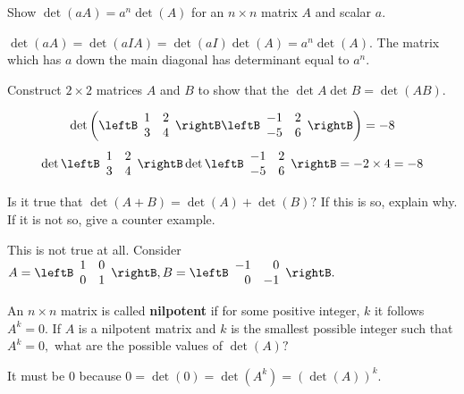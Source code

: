 \begin{enumialphparenastyle}
\begin{ex} Show $\det \left( aA\right) =a^{n}\det \left( A\right) $ for an $n \times n $ matrix $A
$ and scalar $a$. 
\begin{sol}
$\det \left( aA\right) =\det
\left( aIA\right) =\det \left( aI\right) \det \left( A\right) =a^{n}\det
\left( A\right) .$ The matrix which has $a$ down the main diagonal has
determinant equal to $a^{n}$.
\end{sol}
\end{ex}


\begin{ex} Construct $2\times 2$ matrices $A$ and $B$ to show that the
$\det A \det B = \det (AB)$. 
\begin{sol}
\[
\det
\left( \leftB
\begin{array}{cc}
1 & 2 \\
3 & 4
\end{array}
\rightB \leftB
\begin{array}{rr}
-1 & 2 \\
-5 & 6
\end{array}
\rightB \right) = -8
\]
\[
\det \leftB
\begin{array}{cc}
1 & 2 \\
3 & 4
\end{array}
\rightB \det \leftB
\begin{array}{rr}
-1 & 2 \\
-5 & 6
\end{array}
\rightB = -2 \times 4 = -8
\]
\end{sol}
\end{ex}

\begin{ex} Is it true that $\det \left( A+B\right) =\det \left( A\right) +\det
\left( B\right) ?$ If this is so, explain why. If it is not so,
give a counter example.  
\begin{sol}
This is not true at all. Consider $A=\leftB
\begin{array}{cc}
1 & 0 \\
0 & 1
\end{array}
\rightB ,B=\leftB
\begin{array}{rr}
-1 & 0 \\
0 & -1
\end{array}
\rightB .$
\end{sol}
\end{ex}

\begin{ex} An $n\times n$ matrix is called \textbf{nilpotent}
 if for some positive integer, $k$ it follows $A^{k}=0.$ If
$A$ is a nilpotent matrix and $k$ is the smallest possible integer such that
$A^{k}=0,$ what are the possible values of $\det \left( A\right) ?$ 
\begin{sol}
It must
be 0 because $0=\det \left( 0\right) =\det \left( A^{k}\right) =\left( \det
\left( A\right) \right) ^{k}.$
\end{sol}
\end{ex}


\end{enumialphparenastyle}
